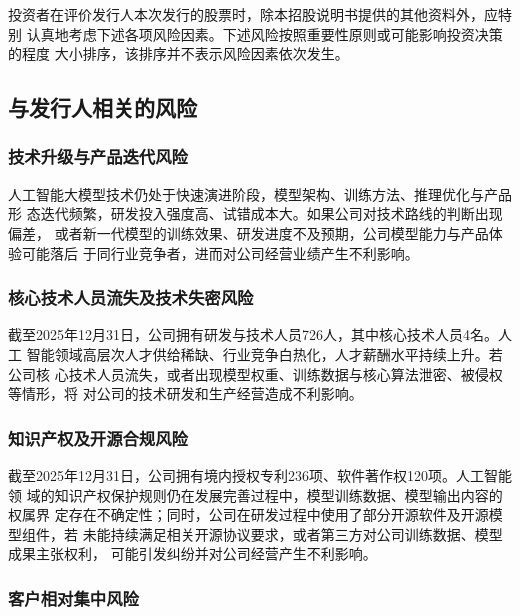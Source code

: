 
投资者在评价发行人本次发行的股票时，除本招股说明书提供的其他资料外，应特别
认真地考虑下述各项风险因素。下述风险按照重要性原则或可能影响投资决策的程度
大小排序，该排序并不表示风险因素依次发生。

\subsection{与发行人相关的风险}

\subsubsection{技术升级与产品迭代风险}

人工智能大模型技术仍处于快速演进阶段，模型架构、训练方法、推理优化与产品形
态迭代频繁，研发投入强度高、试错成本大。如果公司对技术路线的判断出现偏差，
或者新一代模型的训练效果、研发进度不及预期，公司模型能力与产品体验可能落后
于同行业竞争者，进而对公司经营业绩产生不利影响。

\subsubsection{核心技术人员流失及技术失密风险}

截至2025年12月31日，公司拥有研发与技术人员726人，其中核心技术人员4名。人工
智能领域高层次人才供给稀缺、行业竞争白热化，人才薪酬水平持续上升。若公司核
心技术人员流失，或者出现模型权重、训练数据与核心算法泄密、被侵权等情形，将
对公司的技术研发和生产经营造成不利影响。

\subsubsection{知识产权及开源合规风险}

截至2025年12月31日，公司拥有境内授权专利236项、软件著作权120项。人工智能领
域的知识产权保护规则仍在发展完善过程中，模型训练数据、模型输出内容的权属界
定存在不确定性；同时，公司在研发过程中使用了部分开源软件及开源模型组件，若
未能持续满足相关开源协议要求，或者第三方对公司训练数据、模型成果主张权利，
可能引发纠纷并对公司经营产生不利影响。

\subsubsection{客户相对集中风险}

